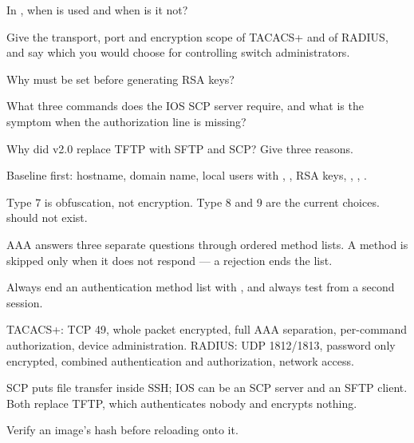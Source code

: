 \begin{checkpoint}
\begin{tightnum}
  \item In , when is
         used and when is it not?
  \item Give the transport, port and encryption scope of TACACS+ and of RADIUS,
        and say which you would choose for controlling switch administrators.
  \item Why must  be set before generating RSA keys?
  \item What three commands does the IOS SCP server require, and what is the
        symptom when the authorization line is missing?
  \item Why did v2.0 replace TFTP with SFTP and SCP? Give three reasons.
\end{tightnum}
\end{checkpoint}

\begin{chaptersummary}
\begin{tight}
  \item Baseline first: hostname, domain name, local users with
        , , RSA keys,
        , , .
  \item Type 7 is obfuscation, not encryption. Type 8 and 9 are the current
        choices.  should not exist.
  \item AAA answers three separate questions through ordered method lists. A
        method is skipped only when it does not respond --- a rejection ends the
        list.
  \item Always end an authentication method list with , and always
        test from a second session.
  \item TACACS+: TCP 49, whole packet encrypted, full AAA separation, per-command
        authorization, device administration. RADIUS: UDP 1812/1813, password
        only encrypted, combined authentication and authorization, network
        access.
  \item SCP puts file transfer inside SSH; IOS can be an SCP server and an SFTP
        client. Both replace TFTP, which authenticates nobody and encrypts
        nothing.
  \item Verify an image's hash before reloading onto it.
\end{tight}
\end{chaptersummary}

